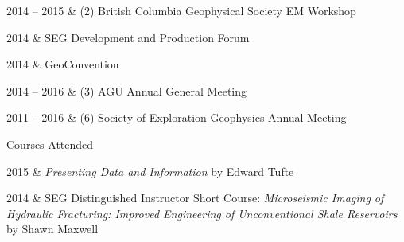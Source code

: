 \documentclass[oneside]{cv}
\newcommand{\subheading}[1]{
    \vspace{0.4cm}
    {\HelveticaNeueUltraLight\fontsize{14pt}{0}\selectfont #1}\\
    \vspace{-0.1cm}
}
\begin{document}
\begin{entryright}
    2014 -- 2015 & (2) British Columbia Geophysical Society EM Workshop
\end{entryright}

\begin{entryright}
    2014         & SEG Development and Production Forum
\end{entryright}

\begin{entryright}
    2014         & GeoConvention
\end{entryright}

\begin{entryright}
    2014 -- 2016 & (3) AGU Annual General Meeting
\end{entryright}

\begin{entryright}
    2011 -- 2016 & (6) Society of Exploration Geophysics Annual Meeting
\end{entryright}



\subheading{Courses Attended}

\begin{entryright}
    2015 & \emph{Presenting Data and Information} by Edward Tufte
\end{entryright}

\begin{entryright}
    2014 & SEG Distinguished Instructor Short Course: \emph{Microseismic Imaging of Hydraulic Fracturing: Improved Engineering of Unconventional Shale Reservoirs} by Shawn Maxwell
\end{entryright}


% 
\end{document}
